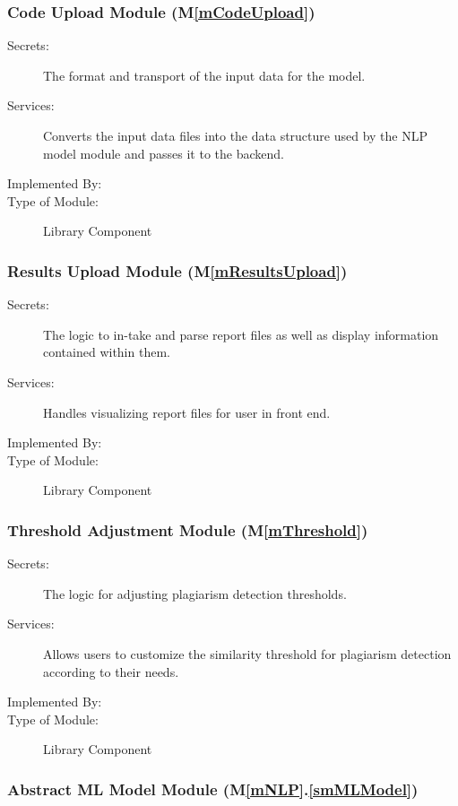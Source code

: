\documentclass[12pt, titlepage]{article}
\newcommand{\mref}[1]{M\ref{#1}}
\newcommand{\smref}[2]{M\ref{#1}.\ref{#2}}
\begin{document}
\subsubsection{Code Upload Module (\mref{mCodeUpload})}

\begin{description}
\item[Secrets:] The format and transport of the input data for the model.
\item[Services:] Converts the input data files into the data structure
used by the NLP model module and passes it to the backend.
\item[Implemented By:] \progname{}
\item[Type of Module:] Library Component
\end{description}

\subsubsection{Results Upload Module (\mref{mResultsUpload})}

\begin{description}
\item[Secrets:] The logic to in-take and parse report files as well as display 
information contained within them.
\item[Services:] Handles visualizing report files for user in front end.
\item[Implemented By:] \progname
\item[Type of Module:] Library Component
\end{description}

\subsubsection{Threshold Adjustment Module (\mref{mThreshold})}

\begin{description}
\item[Secrets:] The logic for adjusting plagiarism detection thresholds.
\item[Services:] Allows users to customize the similarity threshold for 
plagiarism detection according to their needs.
\item[Implemented By:] \progname{}
\item[Type of Module:] Library Component
\end{description}

\subsubsection{Abstract ML Model Module (\smref{mNLP}{smMLModel})}
\end{document}
